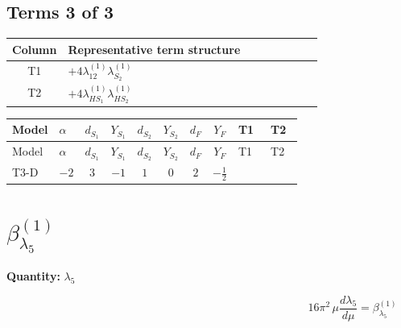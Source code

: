 \documentclass[8pt]{article}
\begin{document}
\begin{landscape}
\subsection*{Terms 3 of 3}
\begin{center}
\begin{tabular}{@{}c >{\raggedright\arraybackslash}p{0.82\linewidth}@{}}
\toprule
Column & Representative term structure \\
\midrule
T1 & \(\displaystyle +4 {\lambda_{12}^{(1)}} {\lambda_{S_2}^{(1)}}\) \\
\midrule
T2 & \(\displaystyle +4 {\lambda_{HS_1}^{(1)}} {\lambda_{HS_2}^{(1)}}\) \\
\midrule
\bottomrule
\end{tabular}
\end{center}
\smallskip
\tiny
\begin{longtable}{@{}llcccccc >{\raggedright\arraybackslash}p{0.21\linewidth} >{\raggedright\arraybackslash}p{0.21\linewidth}@{}}
\toprule
Model & $\alpha$ & $d_{S_1}$ & $Y_{S_1}$ & $d_{S_2}$ & $Y_{S_2}$ & $d_F$ & $Y_F$ & T1 & T2 \\
\midrule
\endfirsthead
\toprule
Model & $\alpha$ & $d_{S_1}$ & $Y_{S_1}$ & $d_{S_2}$ & $Y_{S_2}$ & $d_F$ & $Y_F$ & T1 & T2 \\
\midrule
\endhead
T3-D & $-2$ & $3$ & $-1$ & $1$ & $0$ & $2$ & $-\frac{1}{2}$ & \scriptsize\adjustbox{max width=\linewidth}{$\begin{gathered} +4 {\lambda_{12}^{(1)}} {\lambda_{S_2}^{(1)}}\end{gathered}$} & \scriptsize\adjustbox{max width=\linewidth}{$\begin{gathered} +4 {\lambda_{HS_1}^{(1)}} {\lambda_{HS_2}^{(1)}}\end{gathered}$} \\
\midrule
\bottomrule
\end{longtable}
\clearpage
\section*{$\beta_{\lambda_5}^{(1)}$}
\noindent\textbf{Quantity: }$\lambda_5$\par\smallskip
\[16\pi^2\,\mu\frac{d \lambda_5}{d\mu}=\beta_{\lambda_5}^{(1)}\]

\end{landscape}
\end{document}

